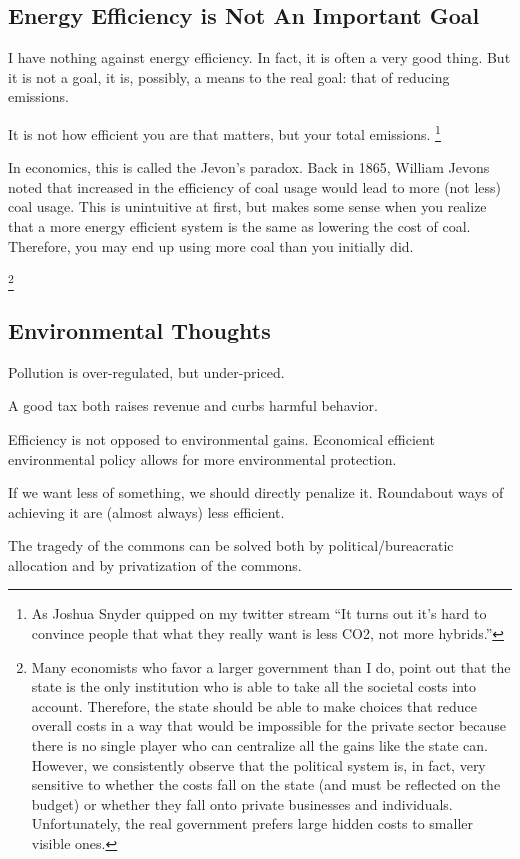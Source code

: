 \subsection{Energy Efficiency is Not An Important Goal}

I have nothing against energy efficiency. In fact, it is often a very good
thing. But it is not a goal, it is, possibly, a means to the real goal: that of
reducing emissions.

It is not how efficient you are that matters, but your total emissions.
\footnote{As Joshua Snyder quipped on my twitter stream ``It turns out it's
hard to convince people that what they really want is less CO2, not more
hybrids.''
}

In economics, this is called the Jevon's paradox. Back in 1865, William Jevons
noted that increased in the efficiency of coal usage would lead to more (not
less) coal usage. This is unintuitive at first, but makes some sense when you
realize that a more energy efficient system is the same as lowering the cost of
coal. Therefore, you may end up using more coal than you initially did.

\footnote{Many economists who favor a larger government than I do, point out
that the state is the only institution who is able to take all the societal
costs into account. Therefore, the state should be able to make choices that
reduce overall costs in a way that would be impossible for the private sector
because there is no single player who can centralize all the gains like the
state can. However, we consistently observe that the political system is, in
fact, very sensitive to whether the costs fall on the state (and must be
reflected on the budget) or whether they fall onto private businesses and
individuals. Unfortunately, the real government prefers large hidden costs to
smaller visible ones.}

\subsection{Environmental Thoughts}

\thought Pollution is over-regulated, but under-priced.

\thought A good tax both raises revenue and curbs harmful behavior.

\thought Efficiency is not opposed to environmental gains. Economical efficient
environmental policy allows for more environmental protection.

\thought If we want less of something, we should directly penalize it.
Roundabout ways of achieving it are (almost always) less efficient.

\thought The tragedy of the commons can be solved both by political/bureacratic
allocation and by privatization of the commons.

